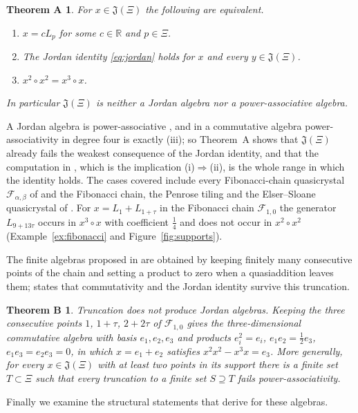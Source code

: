 \documentclass[11pt]{amsart}
\newtheorem*{theoremA}{Theorem A}
\newtheorem*{theoremB}{Theorem B}
\theoremstyle{definition}
\theoremstyle{remark}
\newcommand{\R}{\mathbb{R}}
\newcommand{\J}{\mathfrak{J}}
\begin{document}
\begin{theoremA}
For $x\in\J(\Xi)$ the following are equivalent.
\begin{enumerate}
\item[(i)] $x=cL_p$ for some $c\in\R$ and $p\in\Xi$.
\item[(ii)] The Jordan identity \eqref{eq:jordan} holds for $x$ and every $y\in\J(\Xi)$.
\item[(iii)] $x^2\circ x^2=x^3\circ x$.
\end{enumerate}
In particular $\J(\Xi)$ is neither a Jordan algebra nor a power-associative algebra.
\end{theoremA}

A Jordan algebra is power-associative \cite{Alb48,McC04}, and in a commutative algebra power-associativity in degree four is exactly (iii); so Theorem~A shows that $\J(\Xi)$ already fails the weakest consequence of the Jordan identity, and that the computation in \cite{CCAI23,CCAI25}, which is the implication (i)$\Rightarrow$(ii), is the whole range in which the identity holds. The cases covered include every Fibonacci-chain quasicrystal $\mathcal F_{\alpha,\beta}$ of \cite{CCAI23} and the Fibonacci chain, the Penrose tiling and the Elser--Sloane quasicrystal of \cite{CCAI25}. For $x=L_1+L_{1+\tau}$ in the Fibonacci chain $\mathcal F_{1,0}$ the generator $L_{9+13\tau}$ occurs in $x^3\circ x$ with coefficient $\frac14$ and does not occur in $x^2\circ x^2$ (Example~\ref{ex:fibonacci} and Figure~\ref{fig:supports}).

The finite algebras proposed in \cite[Section~6]{CCAI23} are obtained by keeping finitely many consecutive points of the chain and setting a product to zero when a quasiaddition leaves them; \cite{CCAI23} states that commutativity and the Jordan identity survive this truncation.

\begin{theoremB}
Truncation does not produce Jordan algebras. Keeping the three consecutive points $1$, $1+\tau$, $2+2\tau$ of $\mathcal F_{1,0}$ gives the three-dimensional commutative algebra with basis $e_1,e_2,e_3$ and products $e_i^2=e_i$, $e_1e_2=\frac12e_3$, $e_1e_3=e_2e_3=0$, in which $x=e_1+e_2$ satisfies $x^2x^2-x^3x=e_3$. More generally, for every $x\in\J(\Xi)$ with at least two points in its support there is a finite set $T\subset\Xi$ such that every truncation to a finite set $S\supseteq T$ fails power-associativity.
\end{theoremB}

Finally we examine the structural statements that \cite{CCAI23,CCAI25} derive for these algebras.
\end{document}

